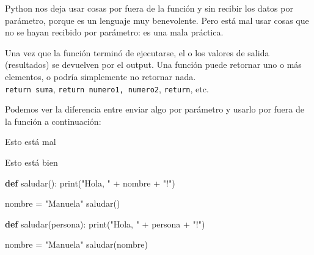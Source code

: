 \documentclass[
  letterpaper,
  DIV=11,
  numbers=noendperiod]{scrreprt}
\newenvironment{Shaded}{\begin{snugshade}}{\end{snugshade}}
\newcommand{\BuiltInTok}[1]{\textcolor[rgb]{0.00,0.23,0.31}{#1}}
\newcommand{\KeywordTok}[1]{\textcolor[rgb]{0.00,0.23,0.31}{\textbf{#1}}}
\newcommand{\NormalTok}[1]{\textcolor[rgb]{0.00,0.23,0.31}{#1}}
\newcommand{\OperatorTok}[1]{\textcolor[rgb]{0.37,0.37,0.37}{#1}}
\newcommand{\StringTok}[1]{\textcolor[rgb]{0.13,0.47,0.30}{#1}}
\begin{document}
\begin{tcolorbox}[enhanced jigsaw, arc=.35mm, toptitle=1mm, colframe=quarto-callout-warning-color-frame, bottomtitle=1mm, opacitybacktitle=0.6, colbacktitle=quarto-callout-warning-color!10!white, leftrule=.75mm, coltitle=black, toprule=.15mm, titlerule=0mm, title=\textcolor{quarto-callout-warning-color}{\faExclamationTriangle}\hspace{0.5em}{¡Cuidado!}, bottomrule=.15mm, rightrule=.15mm, colback=white, breakable, opacityback=0, left=2mm]

Python nos deja usar cosas por fuera de la función y sin recibir los
datos por parámetro, porque es un lenguaje muy benevolente. Pero está
mal usar cosas que no se hayan recibido por parámetro: es una mala
práctica.

\end{tcolorbox}

Una vez que la función terminó de ejecutarse, el o los valores de salida
(resultados) se devuelven por el output. Una función puede retornar uno
o más elementos, o podría simplemente no retornar nada.\\
\texttt{return\ suma}, \texttt{return\ numero1,\ numero2},
\texttt{return}, etc.

Podemos ver la diferencia entre enviar algo por parámetro y usarlo por
fuera de la función a continuación:

Esto está mal

Esto está bien

\begin{Shaded}
\begin{Highlighting}[]
\KeywordTok{def}\NormalTok{ saludar():}
  \BuiltInTok{print}\NormalTok{(}\StringTok{"Hola, "} \OperatorTok{+}\NormalTok{ nombre }\OperatorTok{+} \StringTok{"!"}\NormalTok{)}

\NormalTok{nombre }\OperatorTok{=} \StringTok{"Manuela"}
\NormalTok{saludar()}
\end{Highlighting}
\end{Shaded}

\begin{Shaded}
\begin{Highlighting}[]
\KeywordTok{def}\NormalTok{ saludar(persona):}
  \BuiltInTok{print}\NormalTok{(}\StringTok{"Hola, "} \OperatorTok{+}\NormalTok{ persona }\OperatorTok{+} \StringTok{"!"}\NormalTok{)}

\NormalTok{nombre }\OperatorTok{=} \StringTok{"Manuela"}
\NormalTok{saludar(nombre)}
\end{Highlighting}
\end{Shaded}
\end{document}

